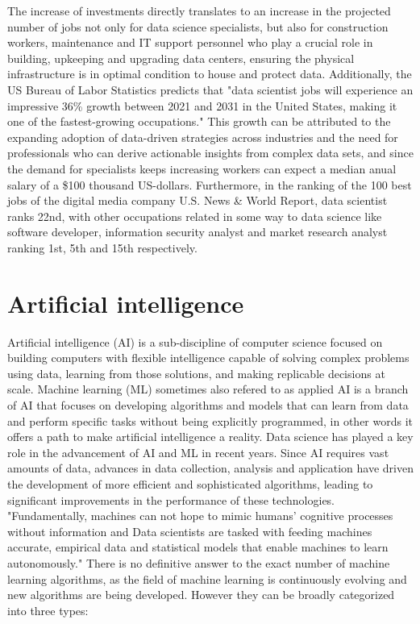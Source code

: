 \documentclass{vgtc}                          %
\begin{document}
The increase of investments directly translates to an increase in the projected number of jobs not only for data science specialists, but also for construction workers, maintenance 
and IT support personnel who play a crucial role in building, upkeeping and upgrading data centers, ensuring the physical infrastructure is in optimal condition to house and protect data. 
Additionally, the US Bureau of Labor Statistics predicts that "data scientist jobs will experience an impressive 36\% growth between 2021 and 2031 in the United States, making it one 
of the fastest-growing occupations."\cite{US-Bureau:2023} This growth can be attributed to the expanding adoption of data-driven strategies across industries and the need for professionals 
who can derive actionable insights from complex data sets, and since the demand for specialists keeps increasing workers can expect a median anual salary of a \$100 thousand US-dollars. 
Furthermore, in the ranking of the 100 best jobs of the digital media company U.S. News \& World Report, data scientist ranks 22nd, with other occupations related in some way to data 
science like software developer, information security analyst and market research analyst ranking 1st, 5th and 15th respectively.\cite{US-News:2023}

\section{Artificial intelligence}

Artificial intelligence (AI) is a sub-discipline of computer science focused on building computers with flexible intelligence capable of solving complex problems using data, learning from those 
solutions, and making replicable decisions at scale. Machine learning (ML) sometimes also refered to as applied AI is a branch of AI that focuses on developing algorithms and models that can 
learn from data and perform specific tasks without being explicitly programmed, in other words it offers a path to make artificial intelligence a reality. Data science has played a key role in the 
advancement of AI and ML in recent years. Since AI requires vast amounts of data, advances in data collection, analysis and application have driven the development 
of more efficient and sophisticated algorithms, leading to significant improvements in the performance of these technologies. "Fundamentally, machines can not hope to mimic humans' cognitive processes 
without information and Data scientists are tasked with feeding machines accurate, empirical data and statistical models that enable machines to learn autonomously."\cite{Rice:2023} There is no 
definitive answer to the exact number of machine learning algorithms, as the field of machine learning is continuously evolving and new algorithms are being developed. However they can be 
broadly categorized into three types:
\end{document}
